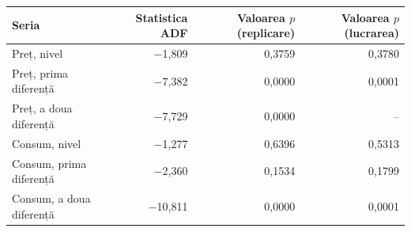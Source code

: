 \begin{tabular}{lrrr}
\toprule
Seria & Statistica ADF & Valoarea $p$ (replicare) & Valoarea $p$ (lucrarea) \\
\midrule
Preț, nivel & $-$1,809 & 0,3759 & 0,3780 \\
Preț, prima diferență & $-$7,382 & 0,0000 & 0,0001 \\
Preț, a doua diferență & $-$7,729 & 0,0000 & -- \\
Consum, nivel & $-$1,277 & 0,6396 & 0,5313 \\
Consum, prima diferență & $-$2,360 & 0,1534 & 0,1799 \\
Consum, a doua diferență & $-$10,811 & 0,0000 & 0,0001 \\
\bottomrule
\end{tabular}
